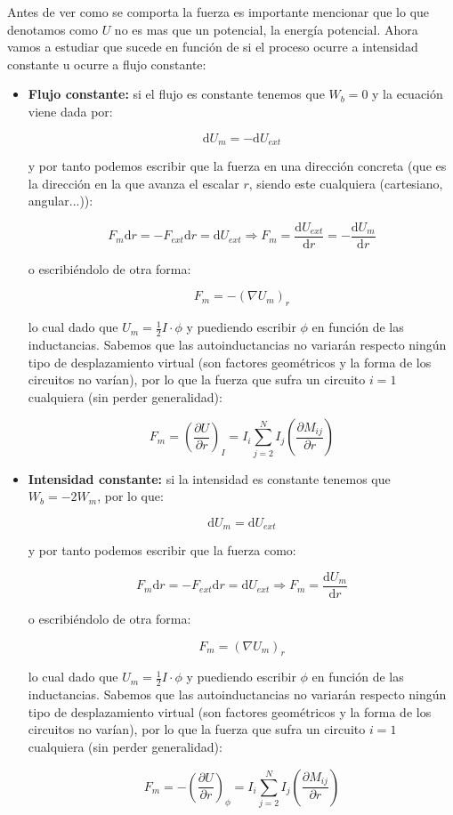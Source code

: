 \documentclass[12pt,a4paper]{article}
\newcommand{\parentesis}[1]{\left( #1  \right)}
\newcommand{\parciales}[2]{\frac{\partial #1}{\partial #2}}
\newcommand{\pparciales}[2]{\parentesis{\parciales{#1}{#2}}}
\newcommand{\D}{\mathrm{d}}
\begin{document}
Antes de ver como se comporta la fuerza es importante mencionar que lo que denotamos como $U$ no es mas que un potencial, la energía potencial. Ahora vamos a estudiar que sucede en función de si el proceso ocurre a intensidad constante u ocurre a flujo constante:

\begin{itemize}
\item \textbf{Flujo constante:} si el flujo es constante tenemos que $W_b = 0$ y la ecuación viene dada por:

$$ \D U_m = - \D U_{ext} $$

y por tanto podemos escribir que la fuerza en una dirección concreta (que es la dirección en la que avanza el escalar $r$, siendo este cualquiera (cartesiano, angular...)):

$$ F_{m} \D r =  - F_{ext} \D r =\D U_{ext} \Longrightarrow F_{m} = \dfrac{\D U_{ext}}{\D r} = - \dfrac{\D U_m}{\D r}$$

o escribiéndolo de otra forma:

\begin{equation}
F_m = - (\nabla U_m)_{r}
\end{equation}

lo cual dado que $U_m = \frac{1}{2} I \cdot \phi$  y puediendo escribir $\phi$ en función de las inductancias. Sabemos que las autoinductancias no variarán respecto ningún tipo de desplazamiento virtual (son factores geométricos y la forma de los circuitos no varían), por lo que la fuerza que sufra un circuito $i=1$ cualquiera (sin perder generalidad):

\begin{equation}
F_m = \pparciales{U}{r}_{I} =   I_i \sum_{j=2}^N I_j \pparciales{M_{ij}}{r}
\end{equation}

\item \textbf{Intensidad constante:} si la intensidad es constante tenemos que $W_b = - 2 W_m$, por lo que:

$$ \D U_m =  \D U_{ext} $$

y por tanto podemos escribir que la fuerza como:

$$ F_{m} \D r =  - F_{ext} \D r =\D U_{ext} \Longrightarrow F_{m} =   \dfrac{\D U_m}{\D r}$$

o escribiéndolo de otra forma:

\begin{equation}
F_m =  (\nabla U_m)_{r}
\end{equation}

lo cual dado que $U_m = \frac{1}{2} I \cdot \phi$  y puediendo escribir $\phi$ en función de las inductancias. Sabemos que las autoinductancias no variarán respecto ningún tipo de desplazamiento virtual (son factores geométricos y la forma de los circuitos no varían), por lo que la fuerza que sufra un circuito $i=1$ cualquiera (sin perder generalidad):

\begin{equation}
F_m = - \pparciales{U}{r}_{\phi} =   I_i \sum_{j=2}^N I_j \pparciales{M_{ij}}{r}
\end{equation}


\end{itemize}
\end{document}
